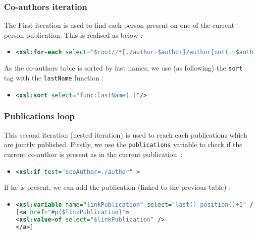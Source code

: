 \documentclass{article}
\begin{document}
    \subsubsection{Co-authors iteration}
      The First iteration is used to find each person present on one of the current person publication. This is realised as below :
      \begin{itemize}
	\item \begin{lstlisting}[language=XML]
<xsl:for-each select="$root//*[./author=$author]/author[not(.=$author)]">\end{lstlisting}
      \end{itemize}
      As the co-authors table is sorted by last names, we use (as following) the \verb|sort| tag with the \verb|lastName| function :
      \begin{itemize}
	\item \begin{lstlisting}[language=XML]
<xsl:sort select="func:lastName(.)"/>\end{lstlisting}
      \end{itemize}
      
    \subsubsection{Publications loop}
    This second iteration (nested iteration) is used to reach each publications which are jointly published. Firstly, we use the \verb|publications| variable to check if the current co-author is present as in the current publication~: 
      \begin{itemize}
	\item \begin{lstlisting}[language=XML]
<xsl:if test="$coAuthor=./author" >\end{lstlisting}
      \end{itemize}
      If he is present, we can add the publication (linked to the previous table) :
      \begin{itemize}
	\item \begin{lstlisting}[language=XML]
<xsl:variable name="linkPublication" select="last()-position()+1" />
[<a href="#p{$linkPublication}">
<xsl:value-of select="$linkPublication" />
</a>]\end{lstlisting}
      \end{itemize}
      
      
\end{document}
